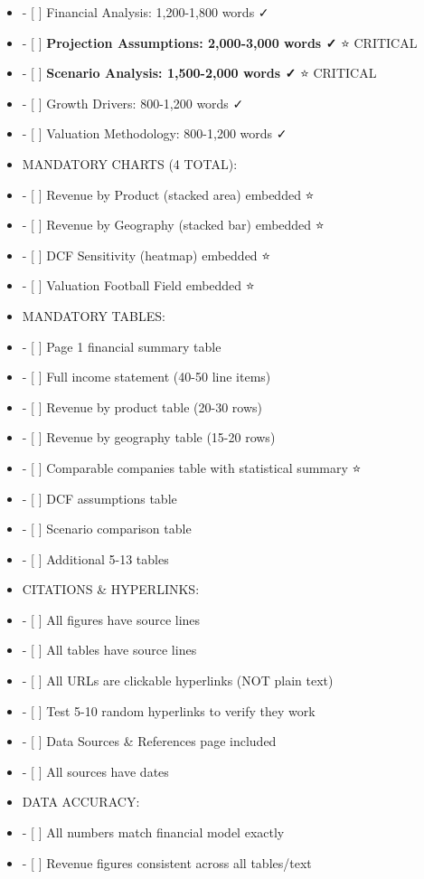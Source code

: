 \documentclass[11pt]{article}
\begin{document}
\begin{itemize}[leftmargin=*,itemsep=2pt,topsep=2pt]
\item {} - [ ] Financial Analysis: 1,200-1,800 words ✓
\item {} - [ ] \textbf{Projection Assumptions: 2,000-3,000 words ✓} ⭐ CRITICAL
\item {} - [ ] \textbf{Scenario Analysis: 1,500-2,000 words ✓} ⭐ CRITICAL
\item {} - [ ] Growth Drivers: 800-1,200 words ✓
\item {} - [ ] Valuation Methodology: 800-1,200 words ✓
\item {} MANDATORY CHARTS (4 TOTAL):
\item {} - [ ] Revenue by Product (stacked area) embedded ⭐
\item {} - [ ] Revenue by Geography (stacked bar) embedded ⭐
\item {} - [ ] DCF Sensitivity (heatmap) embedded ⭐
\item {} - [ ] Valuation Football Field embedded ⭐
\item {} MANDATORY TABLES:
\item {} - [ ] Page 1 financial summary table
\item {} - [ ] Full income statement (40-50 line items)
\item {} - [ ] Revenue by product table (20-30 rows)
\item {} - [ ] Revenue by geography table (15-20 rows)
\item {} - [ ] Comparable companies table with statistical summary ⭐
\item {} - [ ] DCF assumptions table
\item {} - [ ] Scenario comparison table
\item {} - [ ] Additional 5-13 tables
\item {} CITATIONS \& HYPERLINKS:
\item {} - [ ] All figures have source lines
\item {} - [ ] All tables have source lines
\item {} - [ ] All URLs are clickable hyperlinks (NOT plain text)
\item {} - [ ] Test 5-10 random hyperlinks to verify they work
\item {} - [ ] Data Sources \& References page included
\item {} - [ ] All sources have dates
\item {} DATA ACCURACY:
\item {} - [ ] All numbers match financial model exactly
\item {} - [ ] Revenue figures consistent across all tables/text

\end{itemize}
\end{document}
